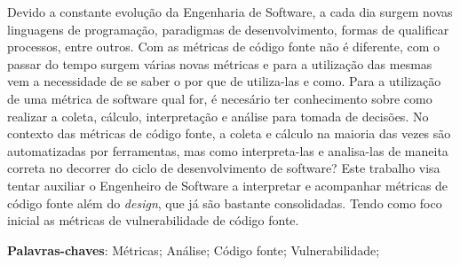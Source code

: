 \begin{resumo}

Devido a constante evolução da Engenharia de Software, a cada dia surgem 
novas linguagens de programação, paradigmas de desenvolvimento, formas de
qualificar processos, entre outros. Com as métricas de código fonte não 
é diferente, com o passar do tempo surgem várias novas métricas e para
a utilização das mesmas vem a necessidade de se saber o por que de 
utiliza-las e como. Para a utilização de uma métrica de software qual for,
é necesário ter conhecimento sobre como realizar a coleta, cálculo, 
interpretação e análise para tomada de decisões. No contexto das métricas de
código fonte, a coleta e cálculo na maioria das vezes são automatizadas por
ferramentas, mas como interpreta-las e analisa-las de maneita correta no
decorrer do ciclo de desenvolvimento de software? Este trabalho visa tentar
auxiliar o Engenheiro de Software a interpretar e acompanhar métricas de 
código fonte além do \textit{design}, que já são bastante consolidadas. Tendo
como foco inicial as métricas de vulnerabilidade de código fonte.

 \vspace{\onelineskip}
    
 \noindent
 \textbf{Palavras-chaves}: Métricas; Análise; Código fonte; Vulnerabilidade;
\end{resumo}

